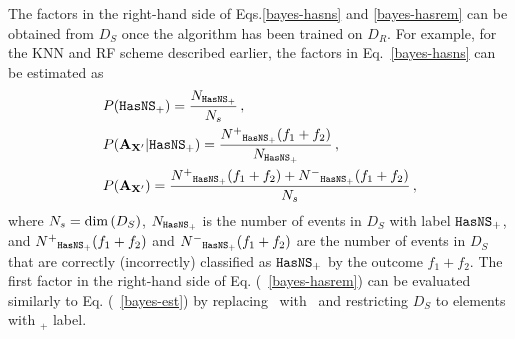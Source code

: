 %
%

The factors in the right-hand side of Eqs.\eqref{bayes-hasns} and \eqref{bayes-hasrem} can be obtained from $D_{S}$ once the algorithm has been trained on $D_{R}$. For example, for the \ac{KNN} and \ac{RF} scheme described earlier, the factors in Eq.~\eqref{bayes-hasns} can be estimated as  
%
\begin{equation}
\begin{aligned}
&P({{\tt HasNS}}_+)=\frac{N_{{{\tt HasNS}}_+}}{N_s}\,,\nonumber\\
&P({\bf A}_{{\bf X}'}|{{\tt HasNS}}_+)=\frac{N^+{}_{{{\tt HasNS}}_+}(f_1+f_2)}{N_{{{\tt HasNS}}_+}}\,,\nonumber\\
&P({\bf A}_{{\bf X}'})=\frac{N^+{}_{{{\tt HasNS}}_+}(f_1+f_2)+N^-{}_{{{\tt HasNS}}_+}(f_1+f_2)}{N_s}\,,
\label{bayes-est}
\end{aligned}
\end{equation}
%
where $N_s=\hbox{dim}\,(D_S)$, $N_{{{\tt HasNS}}_+}$ is the number of events in $D_S$ with label 
${{\tt HasNS}}_+$, and $N^+{}_{{{\tt HasNS}}_+}(f_1+f_2)$ and $N^-{}_{{{\tt HasNS}}_+}(f_1+f_2)$ are the number of events in $D_S$ that are correctly (incorrectly) classified as ${{{\tt HasNS}}_+}$ by the outcome $f_1+f_2$. The first factor in the right-hand side of Eq. (~\ref{bayes-hasrem}) can be evaluated similarly to Eq. (~\ref{bayes-est}) by replacing \hasns\ with \hasrem\ and restricting $D_S$ to elements with \hasns$_+$ label.

